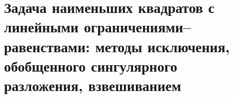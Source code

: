 \section{Задача наименьших квадратов с линейными ограничениями–равенствами: методы исключения, обобщенного сингулярного разложения, взвешиванием}
